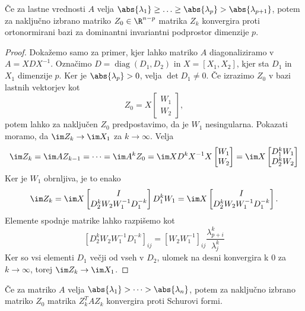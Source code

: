 \begin{izrek}
  Če za lastne vrednosti $A$ velja $\abs{\lambda_1} \ge \ldots \ge \abs{\lambda_p} > \abs{\lambda_{p+1}}$,
  potem za naključno izbrano matriko $Z_0 \in \R^{n-p}$ matrika $Z_k$ konvergira
  proti ortonormirani bazi za dominantni invariantni podprostor dimenzije $p$.
\end{izrek}

\begin{proof}
  Dokažemo samo za primer, kjer lahko matriko $A$ diagonaliziramo v
  $A = X D X^{-1}$.
  Označimo $D = \operatorname{diag}(D_1, D_2)$ in $X = [X_1, X_2]$, kjer sta $D_1$ in
  $X_1$ dimenzije $p$.
  Ker je $\abs{\lambda_p} > 0$, velja $\det D_1 \ne 0$.
  Če izrazimo $Z_0$ v bazi lastnih vektorjev kot
  \[
	Z_0 = X
	\begin{bmatrix}
	  W_1 \\ W_2
	\end{bmatrix},
  \]
  potem lahko za naključen $Z_0$ predpostavimo, da je $W_1$ nesingularna.
  Pokazati moramo, da $\im Z_k \to \im X_1$ za $k \to \infty$.
  Velja
  \[
	\im Z_k = \im A Z_{k-1} = \cdots = \im A^k Z_0
	= \im X D^k X^{-1} X
	\begin{bmatrix}
	  W_1 \\ W_2
	\end{bmatrix}
	= \im X
	\begin{bmatrix}
	  D_1^k W_1 \\ D_2^k W_2
	\end{bmatrix}
  \]
  Ker je $W_1$ obrnljiva, je to enako
  \[
	\im Z_k = \im X
	\begin{bmatrix}
	  I \\ D_2^k W_2 W_1^{-1} D_1^{-k}
	\end{bmatrix}
	D_1^k W_1
	= \im X
	\begin{bmatrix}
	  I \\ D_2^k W_2 W_1^{-1} D_1^{-k}
	\end{bmatrix}.
  \]
  Elemente spodnje matrike lahko razpišemo kot
  \[
	\left[ D_2^k W_2 W_1^{-1} D_1^{-k} \right]_{ij}
	= \left[ W_2 W_1^{-1} \right]_{ij} \frac{\lambda_{p+i}^k}{\lambda_j^k}
  \]
  Ker so vsi elementi $D_1$ večji od vseh v $D_2$, ulomek na desni konvergira k
  $0$ za $k \to \infty$, torej $\im Z_k \to \im X_1$.
\end{proof}


\begin{posledica}
  Če za matriko $A$ velja $\abs{\lambda_1} > \cdots > \abs{\lambda_n}$, potem za naključno
  izbrano matriko $Z_0$ matrika $Z_k^T A Z_k$ konvergira proti Schurovi formi.
\end{posledica}

